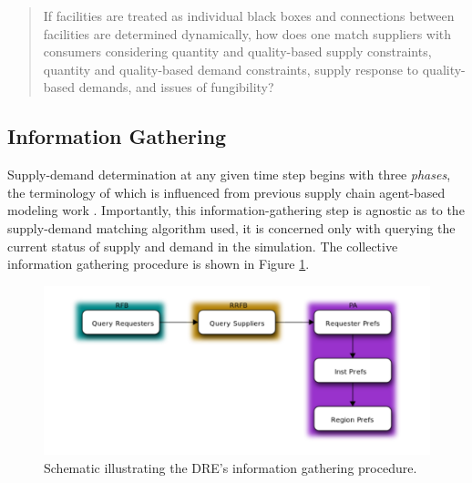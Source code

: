 \begin{quote}
    If facilities are treated as individual black boxes and connections between
    facilities are determined dynamically, how does one match suppliers with
    consumers considering quantity and quality-based supply constraints,
    quantity and quality-based demand constraints, supply response to
    quality-based demands, and issues of fungibility?
\end{quote}

\subsection{Information Gathering}\label{abm:dre:info}

Supply-demand determination at any given time step begins with three
\textit{phases}, the terminology of which is influenced from previous supply
chain agent-based modeling work \cite{julka_agent-based_2002}. Importantly, this
information-gathering step is agnostic as to the supply-demand matching
algorithm used, it is concerned only with querying the current status of supply
and demand in the simulation. The collective information gathering procedure is
shown in Figure \ref{fig:procedure}.

\begin{figure}
  \begin{center}
    \includegraphics[]{./figs/procedure.pdf}
    \caption[]{\label{fig:procedure}
        Schematic illustrating the DRE's information gathering procedure.}
  \end{center}
\end{figure}

